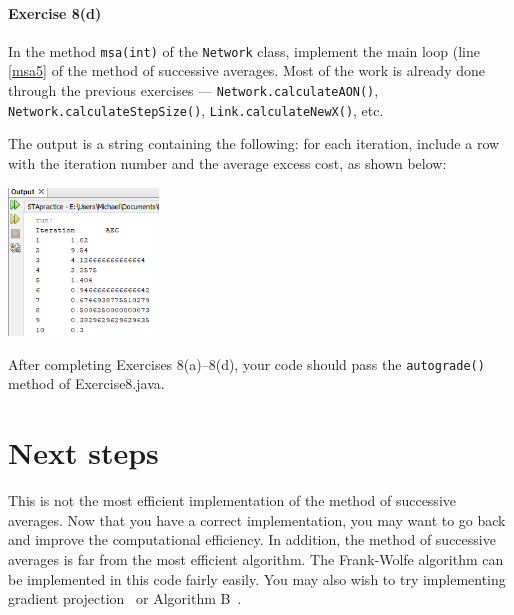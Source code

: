 \documentclass[11pt]{article}
\begin{document}
\paragraph*{Exercise 8(d)} In the method \texttt{msa(int)} of the \texttt{Network} class, implement the main loop (line \ref{msa5} of the method of successive averages. Most of the work is already done through the previous exercises --- \texttt{Network.calculateAON()},  \texttt{Network.calculateStepSize()}, \texttt{Link.calculateNewX()}, etc. 

The output is a string containing the following: for each iteration, include a row with the iteration number and the average excess cost, as shown below:

\begin{center}
	\includegraphics[width=0.3\textwidth]{netbeans8.png}
\end{center}








	

	
	\noindent
	After completing Exercises 8(a)--8(d), your code should pass the \texttt{autograde()} method of Exercise8.java. 
	
	
	
	
	
	\section{Next steps}
	
	This is not the most efficient implementation of the method of successive averages. Now that you have a correct implementation, you may want to go back and improve the computational efficiency. In addition, the method of successive averages is far from the most efficient algorithm. The Frank-Wolfe algorithm can be implemented in this code fairly easily. You may also wish to try implementing gradient projection~\citep{jayakrishnan1994faster} or Algorithm B~\citep{dial2006path}.
	
	
	
	
	
	
	
	
	
	
	
\end{document}
